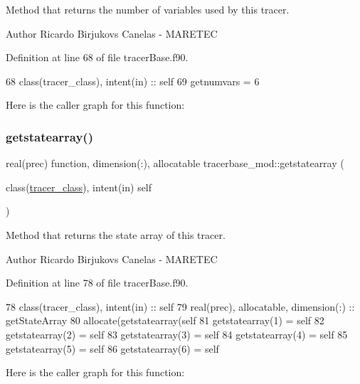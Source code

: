 Method that returns the number of variables used by this tracer. 

\begin{DoxyAuthor}{Author}
Ricardo Birjukovs Canelas -\/ M\+A\+R\+E\+T\+EC 
\end{DoxyAuthor}


Definition at line 68 of file tracer\+Base.\+f90.


\begin{DoxyCode}
68     \textcolor{keywordtype}{class}(tracer\_class), \textcolor{keywordtype}{intent(in)} :: self
69     getnumvars = 6
\end{DoxyCode}
Here is the caller graph for this function\+:
\mbox{\label{namespacetracerbase__mod_adbdd85bd57f1a9debbe7b682099afb1d}} 
\subsubsection{\texorpdfstring{getstatearray()}{getstatearray()}}
{\footnotesize\ttfamily real(prec) function, dimension(\+:), allocatable tracerbase\+\_\+mod\+::getstatearray (\begin{DoxyParamCaption}\item[{class(\mbox{\hyperlink{structtracerbase__mod_1_1tracer__class}{tracer\+\_\+class}}), intent(in)}]{self }\end{DoxyParamCaption})\hspace{0.3cm}{\ttfamily [private]}}



Method that returns the state array of this tracer. 

\begin{DoxyAuthor}{Author}
Ricardo Birjukovs Canelas -\/ M\+A\+R\+E\+T\+EC 
\end{DoxyAuthor}


Definition at line 78 of file tracer\+Base.\+f90.


\begin{DoxyCode}
78     \textcolor{keywordtype}{class}(tracer\_class), \textcolor{keywordtype}{intent(in)} :: self
79     \textcolor{keywordtype}{real(prec)}, \textcolor{keywordtype}{allocatable}, \textcolor{keywordtype}{dimension(:)} :: getStateArray
80     \textcolor{keyword}{allocate}(getstatearray(self%
81     getstatearray(1) = self%
82     getstatearray(2) = self%
83     getstatearray(3) = self%
84     getstatearray(4) = self%
85     getstatearray(5) = self%
86     getstatearray(6) = self%
\end{DoxyCode}
Here is the caller graph for this function\+:
\mbox{\label{namespacetracerbase__mod_ae320123e374df674769dbd48ba5ef46f}} 
